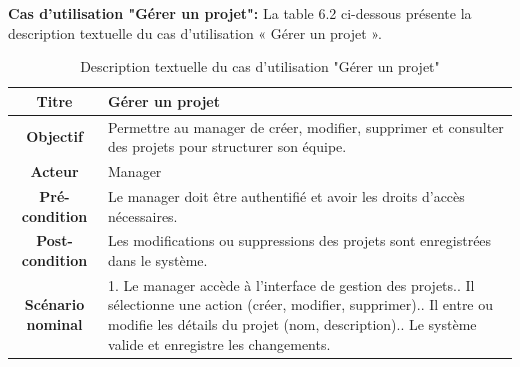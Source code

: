      \item \textbf{Cas d'utilisation "Gérer un projet": } La table 6.2 ci-dessous présente la description textuelle du cas d'utilisation « Gérer un projet ».

 \begin{table}[H]
 \caption{ Description textuelle du cas d’utilisation "Gérer un projet"}
    \centering
    \begin{tabular}{|c|p{12cm}|}
    \hline
    \textbf{Titre} & Gérer un projet \\
    \hline
    \textbf{Objectif} & Permettre au manager de créer, modifier, supprimer et consulter des projets pour structurer son équipe. \\
    \hline
    \textbf{Acteur}& Manager\\
    \hline
    \textbf{Pré-condition} &Le manager doit être authentifié et avoir les droits d’accès nécessaires.
    \\
    \hline
    \textbf{Post-condition} &Les modifications ou suppressions des projets sont enregistrées dans le système.\\
    \hline
    \textbf{Scénario nominal} & 1. Le manager accède à l’interface de gestion des projets.\newline
    2. Il sélectionne une action (créer, modifier, supprimer).\newline
    3. Il entre ou modifie les détails du projet (nom, description).\newline
    4. Le système valide et enregistre les changements.
    \\
    \hline
    \end{tabular}
    \label{tab:user_stories}
\end{table}

